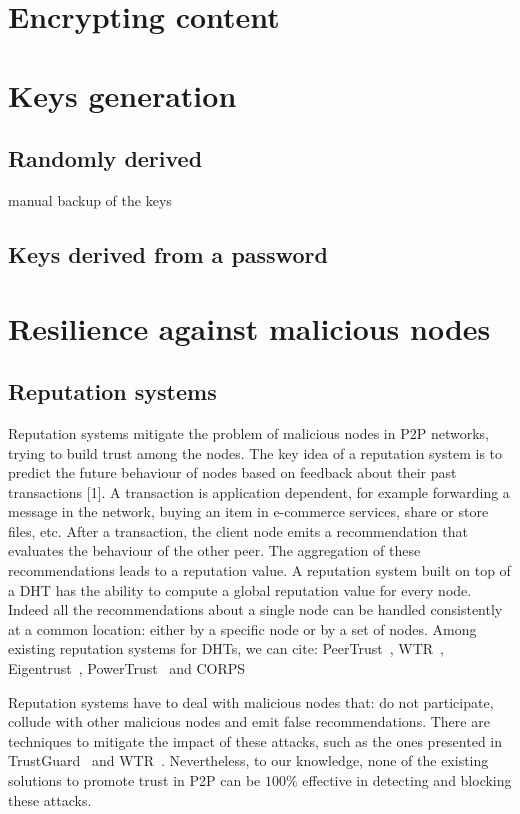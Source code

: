 \section{Encrypting content}

\section{Keys generation}
\subsection{Randomly derived}
  manual backup of the keys
\subsection{Keys derived from a password}

\section{Resilience against malicious nodes}

 \subsection{Reputation systems}
Reputation systems mitigate the problem of malicious nodes in
P2P networks, trying to build trust among the nodes. The key
idea of a reputation system is to predict the future behaviour
of nodes based on feedback about their past transactions [1]. A
transaction is application dependent, for example forwarding a
message in the network, buying an item in e-commerce services,
share or store files, etc. After a transaction, the client node emits
a recommendation that evaluates the behaviour of the other peer.
The aggregation of these recommendations leads to a reputation
value.
A reputation system built on top of a DHT has the ability
to compute a global reputation value for every node. Indeed
all the recommendations about a single node can be handled
consistently at a common location: either by a specific node
or by a set of nodes. Among existing reputation systems for
DHTs, we can cite: PeerTrust~\cite{peertrust}, WTR~\cite{wtr},
Eigentrust~\cite{eigentrust},
PowerTrust~\cite{powertrust} and CORPS~\cite{corps}

Reputation systems have to deal with malicious nodes that:
do not participate, collude with other malicious nodes and
emit false recommendations. There are techniques to mitigate
the impact of these attacks, such as the ones presented in
TrustGuard~\cite{trustguard} and WTR~\cite{wtr}. Nevertheless, to our knowledge,
none of the existing solutions to promote trust in P2P can be
$100\%$ effective in detecting and blocking these attacks.

